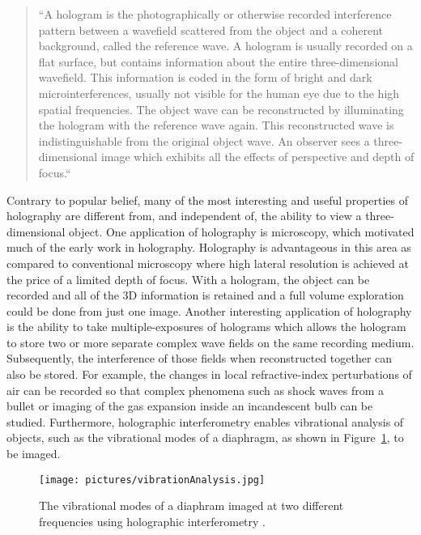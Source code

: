 \begin{quote}
``A hologram is the photographically or otherwise recorded
interference pattern between a wavefield scattered from the
object and a coherent background, called the reference wave.
A hologram is usually recorded on a flat surface, but contains
information about the entire three-dimensional wavefield.
This information is coded in the form of bright and dark
microinterferences, usually not visible for the human eye due
to the high spatial frequencies. The object wave can be
reconstructed by illuminating the hologram with the reference
wave again. This reconstructed wave is indistinguishable from
the original object wave. An observer sees a three-dimensional
image which exhibits all the effects of perspective and depth
of focus.``
\end{quote}
Contrary to popular belief, many of the most interesting and useful properties
of holography are different from, and independent of, the ability to view a
three-dimensional object.
One application of holography is microscopy, which
motivated much of the early work in holography.
Holography is advantageous in this area as compared to conventional microscopy
where high
lateral resolution is achieved at the price of a limited depth of focus. 
With a hologram, the object can be recorded and all of the 3D information is retained
and a full volume exploration could be done from just one image.
Another interesting application of holography is the ability to take
multiple-exposures of holograms which allows the hologram to store two or more
separate complex wave fields on the same recording medium. Subsequently, the
interference of those fields when reconstructed together can also be stored. For example, the
changes in local refractive-index perturbations of air can be recorded so that
complex phenomena such as shock waves from a bullet or imaging of the gas expansion
inside an incandescent bulb can be studied. 
Furthermore, holographic interferometry enables vibrational analysis of objects, 
such as the vibrational modes of a diaphragm, as shown in
Figure~\ref{fig:vibrationAnalysis}, to be imaged.

\begin{figure}[htbp!]
\begin{center}
    \texttt{[image: pictures/vibrationAnalysis.jpg]}
\end{center}
\caption{The vibrational modes of a diaphram imaged at two different
    frequencies using holographic interferometry \cite{vibration}.}
\label{fig:vibrationAnalysis}
\end{figure}


